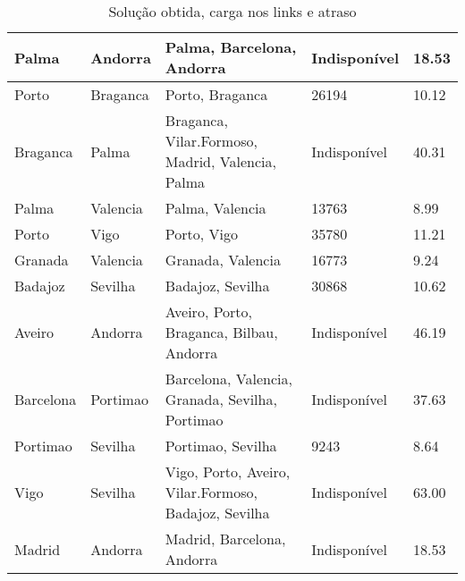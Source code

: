 \begin{table}[!htb]
{\begin{tabular}{|l|l|l|l|l|}
Palma & Andorra & Palma, Barcelona, Andorra & Indisponível & 18.53 \\ \hline
Porto & Braganca & Porto, Braganca & 26194 & 10.12 \\ \hline
Braganca & Palma & Braganca, Vilar.Formoso, Madrid, Valencia, Palma & Indisponível & 40.31 \\ \hline
Palma & Valencia & Palma, Valencia & 13763 & 8.99 \\ \hline
Porto & Vigo & Porto, Vigo & 35780 & 11.21 \\ \hline
Granada & Valencia & Granada, Valencia & 16773 & 9.24 \\ \hline
Badajoz & Sevilha & Badajoz, Sevilha & 30868 & 10.62 \\ \hline
Aveiro & Andorra & Aveiro, Porto, Braganca, Bilbau, Andorra & Indisponível & 46.19 \\ \hline
Barcelona & Portimao & Barcelona, Valencia, Granada, Sevilha, Portimao & Indisponível & 37.63 \\ \hline
Portimao & Sevilha & Portimao, Sevilha & 9243 & 8.64 \\ \hline
Vigo & Sevilha & Vigo, Porto, Aveiro, Vilar.Formoso, Badajoz, Sevilha & Indisponível & 63.00 \\ \hline
Madrid & Andorra & Madrid, Barcelona, Andorra & Indisponível & 18.53 \\ \hline
\end{tabular}}
\caption[]{Solução obtida, carga nos links e atraso}
\end{table}


